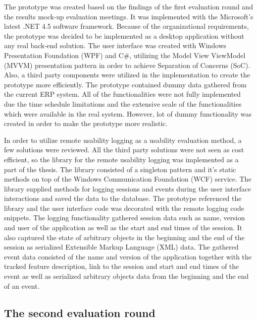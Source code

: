 \documentclass[12pt,a4paper,oneside,pdftex]{report}
\begin{document}
The prototype was created based on the findings of the first evaluation round and the results mock-up evaluation meetings. It was implemented with the Microsoft's latest .NET 4.5 software framework. Because of the organizational requirements, the prototype was decided to be implemented as a desktop application without any real back-end solution. The user interface was created with Windows Presentation Foundation (WPF) and C\#, utilizing the Model View ViewModel (MVVM) presentation pattern in order to achieve Separation of Concerns (SoC). \cite{RefWorks:37} Also, a third party components were utilized in the implementation to create the prototype more efficiently. The prototype contained dummy data gathered from the current ERP system. All of the functionalities were not fully implemented due the time schedule limitations and the extensive scale of the functionalities which were available in the real system. However, lot of dummy functionality was created in order to make the prototype more realistic.

In order to utilize remote usability logging as a usability evaluation method, a few solutions were reviewed. All the third party solutions were not seen as cost efficient, so the library for the remote usability logging was implemented as a part of the thesis. The library consisted of a singleton pattern and it's static methods on top of the Windows Communication Foundation (WCF) service. The library supplied methods for logging sessions and events during the user interface interactions and saved the data to the database. The prototype referenced the library and the user interface code was  decorated with the remote logging code snippets. The logging functionality gathered session data such as name, version and user of the application as well as the start and end times of the session. It also captured the state of arbitrary objects in the beginning and the end of the session as serialized Extensible Markup Language (XML) data. The gathered event data consisted of the name and version of the application together with the tracked feature description, link to the session and start and end times of the event as well as serialized arbitrary objects data from the beginning and the end of an event.

	  
\subsection{The second evaluation round}
\end{document}
